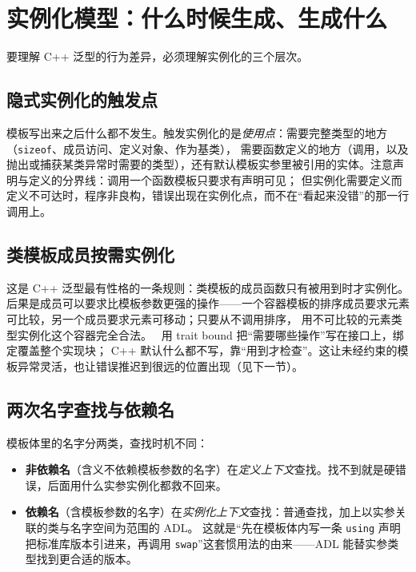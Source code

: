 \documentclass[12pt,a4paper,fontset=fandol]{ctexbook}
\newcommand{\rustlabel}{%
  \tcbox[on line,colback=rustheadbg,colframe=rustheadbg,
    boxrule=0pt,arc=1pt,left=2pt,right=2pt,top=1pt,bottom=1pt,
    colupper=white,fontupper=\scriptsize\bfseries]{Rust}}
\newcommand{\cpp}[1]{C++#1}
\newcommand{\kw}[1]{\texttt{#1}}
\begin{document}
\section{实例化模型：什么时候生成、生成什么}

要理解 \cpp{} 泛型的行为差异，必须理解实例化的三个层次。

\subsection{隐式实例化的触发点}

模板写出来之后什么都不发生。触发实例化的是\emph{使用点}：需要完整类型的地方（\kw{sizeof}、成员访问、定义对象、作为基类），
需要函数定义的地方（调用，以及抛出或捕获某类异常时需要的类型），还有默认模板实参里被引用的实体。注意声明与定义的分界线：调用一个函数模板只要求有声明可见；
但实例化需要定义而定义不可达时，程序非良构，错误出现在实例化点，而不在“看起来没错”的那一行调用上。

\subsection{类模板成员按需实例化}

这是 \cpp{} 泛型最有性格的一条规则：类模板的成员函数只有被用到时才实例化。
后果是成员可以要求比模板参数更强的操作——一个容器模板的排序成员要求元素可比较，另一个成员要求元素可移动；只要从不调用排序，
用不可比较的元素类型实例化这个容器完全合法。\rustlabel\ 用 trait bound 把“需要哪些操作”写在接口上，绑定覆盖整个实现块；
\cpp{} 默认什么都不写，靠“用到才检查”。这让未经约束的模板异常灵活，也让错误推迟到很远的位置出现（见下一节）。

\subsection{两次名字查找与依赖名}

模板体里的名字分两类，查找时机不同：

\begin{itemize}
  \item \textbf{非依赖名}（含义不依赖模板参数的名字）在\emph{定义上下文}查找。找不到就是硬错误，后面用什么实参实例化都救不回来。
  \item \textbf{依赖名}（含模板参数的名字）在\emph{实例化上下文}查找：普通查找，加上以实参关联的类与名字空间为范围的 ADL。
这就是“先在模板体内写一条 \kw{using} 声明把标准库版本引进来，再调用 \kw{swap}”这套惯用法的由来——ADL
能替实参类型找到更合适的版本。
\end{itemize}
\end{document}
